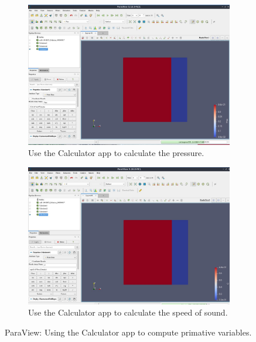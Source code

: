 \begin{appendices}
\begin{figure}\ContinuedFloat
\centering
\begin{subfigure}{.95\textwidth}
  \centering
  \includegraphics[width=.9\linewidth,height=0.9\linewidth,scale=1]{figures/paraviewGrabs/CalculatorPres.jpg}
  \caption{Use the Calculator app to calculate the pressure.}
  \label{fig:CalcPres}
\end{subfigure}
\begin{subfigure}{.95\textwidth}
  \centering
  \includegraphics[width=.9\linewidth,height=0.9\linewidth,scale=1]{figures/paraviewGrabs/CalculatorC.jpg}
  \caption{Use the Calculator app to calculate the speed of sound.}
  \label{fig:CalcC}
\end{subfigure}
\caption{ParaView: Using the Calculator app to compute primative variables.}
\label{fig:CalcExamples}
\end{figure}


\end{appendices}
